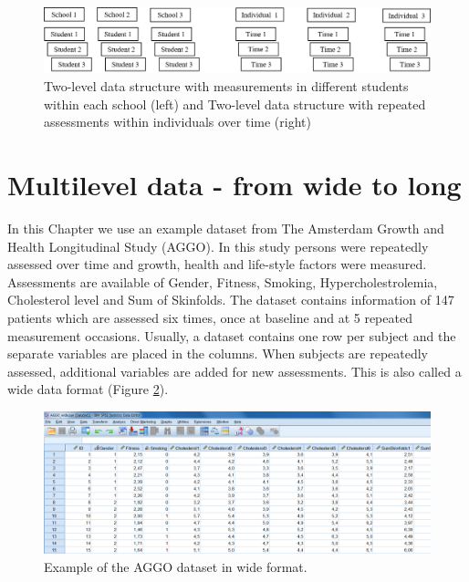 \documentclass[]{book}
\begin{document}
\begin{figure}

{\centering \includegraphics[width=0.9\linewidth]{images/fig7.1} 

}

\caption{Two-level data structure with measurements in different students within each school (left) and Two-level data structure with repeated assessments within individuals over time (right)}\label{fig:fig71}
\end{figure}

\section{Multilevel data - from wide to
long}\label{multilevel-data---from-wide-to-long-1}

In this Chapter we use an example dataset from The Amsterdam Growth and
Health Longitudinal Study (AGGO). In this study persons were repeatedly
assessed over time and growth, health and life-style factors were
measured. Assessments are available of Gender, Fitness, Smoking,
Hypercholestrolemia, Cholesterol level and Sum of Skinfolds. The dataset
contains information of 147 patients which are assessed six times, once
at baseline and at 5 repeated measurement occasions. Usually, a dataset
contains one row per subject and the separate variables are placed in
the columns. When subjects are repeatedly assessed, additional variables
are added for new assessments. This is also called a wide data format
(Figure \ref{fig:fig72}).

\begin{figure}

{\centering \includegraphics[width=0.9\linewidth]{images/fig7.2} 

}

\caption{Example of the AGGO dataset in wide format.}\label{fig:fig72}
\end{figure}
\end{document}
